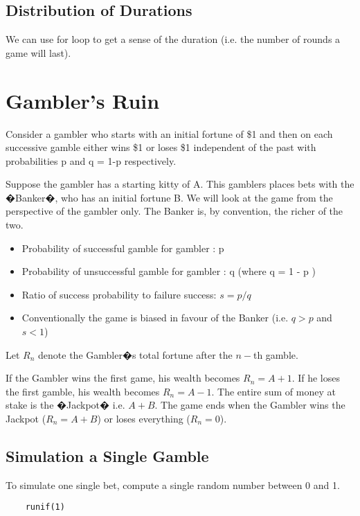 \documentclass[a4paper,12pt]{article}
\begin{document}
\subsection{Distribution of Durations}
We can use for loop to get a sense of the duration (i.e. the number of rounds a game will last).
\newpage



\section{Gambler's Ruin}

Consider a gambler who starts with an initial fortune of \$1 and then on each successive gamble
either wins \$1 or loses \$1 independent of the past with probabilities p and q = 1-p respectively.

Suppose the gambler has a starting kitty of A.
This gamblers places bets with the �Banker�, who has an initial fortune B. We will look at the game from the perspective of the gambler only.
The Banker is, by convention, the richer of the two.

\begin{itemize}
	\item Probability of successful gamble for gambler : p
	\item Probability of unsuccessful gamble for gambler : q 	(where q =  1 - p )
	\item Ratio of success probability to failure success:	$s = p / q$
	\item Conventionally the game is biased in favour of the Banker (i.e. $q>p$ and $s<1$)
\end{itemize}

Let $R_n$ denote the Gambler�s total fortune after the $n-$th gamble.

If the Gambler wins the first game, his wealth becomes $R_n =A+1$.
If he loses the first gamble, his wealth becomes $R_n = A-1$.
The entire sum of money at stake is the �Jackpot� i.e.   $A+B$.
The game ends when the Gambler wins the Jackpot ($R_n = A+B$) or loses everything ($R_n = 0$).


\subsection{Simulation a Single Gamble}


To simulate one single bet, compute a single random number between 0 and 1.
\begin{framed}
	\begin{verbatim}
	runif(1)
	\end{verbatim}
\end{framed}
\end{document}
